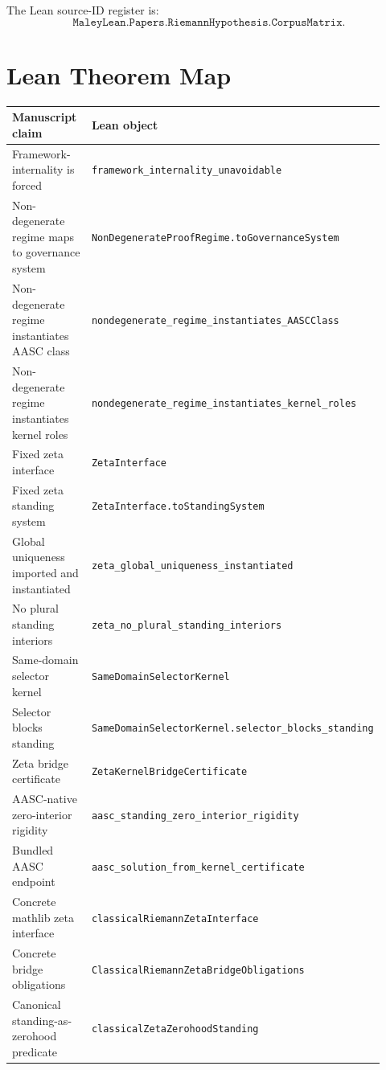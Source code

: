 \documentclass[11pt]{article}
\begin{document}
The Lean source-ID register is:
\[
\texttt{MaleyLean.Papers.RiemannHypothesis.CorpusMatrix}.
\]

\section{Lean Theorem Map}

\begin{center}
\begin{longtable}{p{0.44\linewidth}p{0.48\linewidth}}
\toprule
Manuscript claim & Lean object \\
\midrule
Framework-internality is forced
  & \texttt{framework\_internality\_unavoidable} \\
Non-degenerate regime maps to governance system
  & \texttt{NonDegenerateProofRegime.toGovernanceSystem} \\
Non-degenerate regime instantiates AASC class
  & \texttt{nondegenerate\_regime\_instantiates\_AASCClass} \\
Non-degenerate regime instantiates kernel roles
  & \texttt{nondegenerate\_regime\_instantiates\_kernel\_roles} \\
Fixed zeta interface
  & \texttt{ZetaInterface} \\
Fixed zeta standing system
  & \texttt{ZetaInterface.toStandingSystem} \\
Global uniqueness imported and instantiated
  & \texttt{zeta\_global\_uniqueness\_instantiated} \\
No plural standing interiors
  & \texttt{zeta\_no\_plural\_standing\_interiors} \\
Same-domain selector kernel
  & \texttt{SameDomainSelectorKernel} \\
Selector blocks standing
  & \texttt{SameDomainSelectorKernel.selector\_blocks\_standing} \\
Zeta bridge certificate
  & \texttt{ZetaKernelBridgeCertificate} \\
AASC-native zero-interior rigidity
  & \texttt{aasc\_standing\_zero\_interior\_rigidity} \\
Bundled AASC endpoint
  & \texttt{aasc\_solution\_from\_kernel\_certificate} \\
Concrete mathlib zeta interface
  & \texttt{classicalRiemannZetaInterface} \\
Concrete bridge obligations
  & \texttt{ClassicalRiemannZetaBridgeObligations} \\
Canonical standing-as-zerohood predicate
  & \texttt{classicalZetaZerohoodStanding} \\

\end{longtable}
\end{center}
\end{document}
